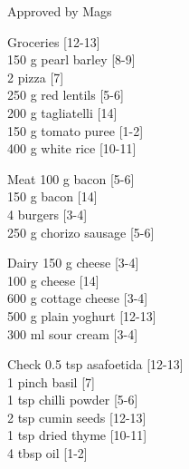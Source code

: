 \begin{menu}{Approved by Mags}
\begin{shoppinglist}{Groceries}
        {\scriptsize[12-13]}\\
      150 g pearl barley 
        {\scriptsize[8-9]}\\
      2  pizza 
        {\scriptsize[7]}\\
      250 g red lentils 
        {\scriptsize[5-6]}\\
      200 g tagliatelli 
        {\scriptsize[14]}\\
      150 g tomato puree 
        {\scriptsize[1-2]}\\
      400 g white rice 
        {\scriptsize[10-11]}\\
      \end{shoppinglist}%
      \par\vfil %
      \begin{shoppinglist}{Meat}
      100 g bacon 
        {\scriptsize[5-6]}\\
      150 g bacon 
        {\scriptsize[14]}\\
      4  burgers 
        {\scriptsize[3-4]}\\
      250 g chorizo sausage 
        {\scriptsize[5-6]}\\
      \end{shoppinglist}%
      \begin{shoppinglist}{Dairy}
      150 g cheese 
        {\scriptsize[3-4]}\\
      100 g cheese 
        {\scriptsize[14]}\\
      600 g cottage cheese 
        {\scriptsize[3-4]}\\
      500 g plain yoghurt 
        {\scriptsize[12-13]}\\
      300 ml sour cream 
        {\scriptsize[3-4]}\\
      \end{shoppinglist}%
      \par\vfil %
      \vfil\clearpage %
      \begin{shoppinglist}{Check}
      0.5 tsp asafoetida 
        {\scriptsize[12-13]}\\
      1 pinch basil 
        {\scriptsize[7]}\\
      1 tsp chilli powder 
        {\scriptsize[5-6]}\\
      2 tsp cumin seeds 
        {\scriptsize[12-13]}\\
      1 tsp dried thyme 
        {\scriptsize[10-11]}\\
      4 tbsp oil 
        {\scriptsize[1-2]}\\

\end{shoppinglist}
\end{menu}
